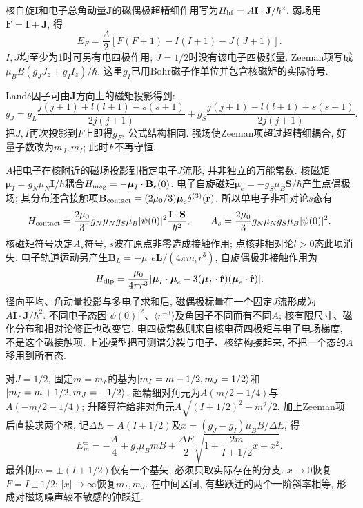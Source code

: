 核自旋$\mathbf I$和电子总角动量$\mathbf J$的磁偶极超精细作用写为$H_{\rm hf}=A\mathbf I\cdot\mathbf J/\hbar^2$. 弱场用$\mathbf F=\mathbf I+\mathbf J$, 得
\[E_F=\frac A2[F(F+1)-I(I+1)-J(J+1)].\]
$I,J$均至少为1时可另有电四极作用; $J=1/2$时没有该电子四极张量. Zeeman项写成$\mu_BB(g_JJ_z+g_II_z)/\hbar$, 这里$g_I$已用Bohr磁子作单位并包含核磁矩的实际符号.

Landé因子可由$\mathbf J$方向上的磁矩投影得到:
\[g_J=g_L\frac{j(j+1)+l(l+1)-s(s+1)}{2j(j+1)}+g_S\frac{j(j+1)-l(l+1)+s(s+1)}{2j(j+1)}.\]
把$J,I$再次投影到$F$上即得$g_F$, 公式结构相同. 强场使Zeeman项超过超精细耦合, 好量子数改为$m_J,m_I$; 此时$F$不再守恒.

$A$把电子在核附近的磁场投影到指定电子$J$流形, 并非独立的万能常数. 核磁矩$\boldsymbol\mu_I=g_N\mu_N\mathbf I/\hbar$耦合$H_{\rm mag}=-\boldsymbol\mu_I\cdot\mathbf B_e(0)$. 电子自旋磁矩$\boldsymbol\mu_e=-g_S\mu_B\mathbf S/\hbar$产生点偶极场; 其分布还含接触项$\mathbf B_{\rm contact}=(2\mu_0/3)\boldsymbol\mu_e\delta^{(3)}(\mathbf r)$. 所以单电子非相对论$s$态有
\[H_{\rm contact}=\frac{2\mu_0}{3}g_N\mu_Ng_S\mu_B
 |\psi(0)|^2\frac{\mathbf I\cdot\mathbf S}{\hbar^2},\qquad
 A_s=\frac{2\mu_0}{3}g_N\mu_Ng_S\mu_B|\psi(0)|^2.\]
核磁矩符号决定$A_s$符号, $s$波在原点非零造成接触作用; 点核非相对论$l>0$态此项消失. 电子轨道运动另产生$\mathbf B_L=-\mu_0e\mathbf L/(4\pi m_er^3)$, 自旋偶极非接触作用为
\[H_{\rm dip}=\frac{\mu_0}{4\pi r^3}
 [\boldsymbol\mu_I\cdot\boldsymbol\mu_e
 -3(\boldsymbol\mu_I\cdot\hat{\mathbf r})(\boldsymbol\mu_e\cdot\hat{\mathbf r})].\]
径向平均、角动量投影与多电子求和后, 磁偶极标量在一个固定$J$流形成为$A\mathbf I\cdot\mathbf J/\hbar^2$. 不同电子态因$|\psi(0)|^2$、$\langle r^{-3}\rangle$及角因子不同而有不同$A$; 核有限尺寸、磁化分布和相对论修正也改变它. 电四极常数则来自核电荷四极矩与电子电场梯度, 不是这个磁接触项. 上述模型把可测谱分裂与电子、核结构接起来, 不把一个态的$A$移用到所有态.

对$J=1/2$, 固定$m=m_F$的基为$\lvert m_I=m-1/2,m_J=1/2\rangle$和$\lvert m_I=m+1/2,m_J=-1/2\rangle$. 超精细对角元为$A(m/2-1/4)$与$A(-m/2-1/4)$; 升降算符给非对角元$A\sqrt{(I+1/2)^2-m^2}/2$. 加上Zeeman项后直接求两个根, 记$\Delta E=A(I+1/2)$及$x=(g_J-g_I)\mu_BB/\Delta E$, 得
\begin{equation}E_m^{\pm}=-\frac A4+g_I\mu_BmB\pm\frac{\Delta E}{2}\sqrt{1+\frac{2m}{I+1/2}x+x^2}.\label{eq:BR}\end{equation}
最外侧$m=\pm(I+1/2)$仅有一个基矢, 必须只取实际存在的分支. $x\to0$恢复$F=I\pm1/2$; $|x|\to\infty$恢复$m_I,m_J$. 在中间区间, 有些跃迁的两个一阶斜率相等, 形成对磁场噪声较不敏感的钟跃迁.


